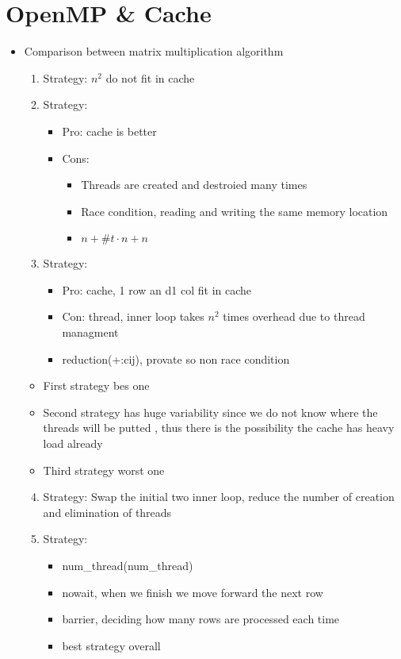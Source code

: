 \documentclass[12pt,oneside]{report}
\begin{document}
\chapter{OpenMP \& Cache}
\begin{itemize}
    \item Comparison between matrix multiplication algorithm
    \begin{enumerate}
        \item Strategy: \(n^2\) do not fit in cache
        \item Strategy: 
        \begin{itemize}
            \item Pro: cache is better
            \item Cons: 
            \begin{itemize}
                \item Threads are created and destroied many times
                \item Race condition, reading and writing the same memory location
                \item \(n + \#t \cdot n + n\)
            \end{itemize}
        \end{itemize}
        \item Strategy:
        \begin{itemize}
            \item Pro: cache, 1 row an d1 col fit in cache
            \item Con: thread, inner loop takes \(n^2\) times overhead due to thread managment
            \item reduction(+:cij), provate so non race condition
        \end{itemize}
    \end{enumerate}
    \begin{itemize}
        \item First strategy bes one
        \item Second strategy has huge variability since we do not know where the threads will be putted , thus there is the possibility the cache has heavy load already
        \item Third strategy worst one
    \end{itemize}
    \begin{enumerate}
        \setcounter{enumi}{3}
        \item Strategy: Swap the initial two inner loop, reduce the number of creation and elimination of threads
        \item Strategy:
        \begin{itemize}
            \item num\_thread(num\_thread)
            \item nowait, when we finish we move forward the next row
            \item barrier, deciding how many rows are processed each time
            \item best strategy overall
        \end{itemize}
    \end{enumerate}
\end{itemize}
\end{document}

